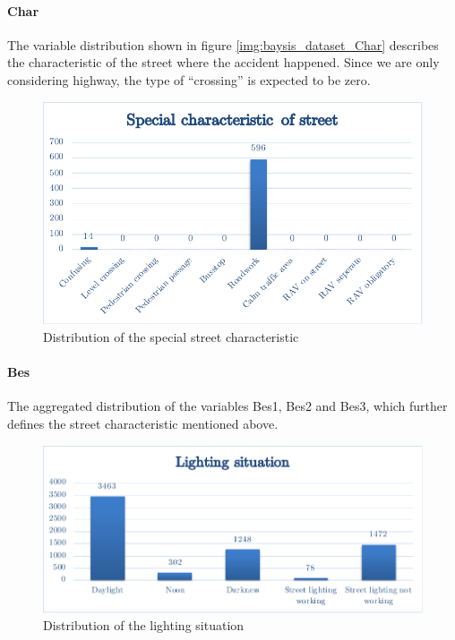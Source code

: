 \documentclass[a4paper,12pt]{report}
\begin{document}
\paragraph{Char}
The variable distribution shown in figure \ref{img:baysis_dataset_Char} describes the characteristic of the street where the accident happened. Since we are only considering highway, the type of “crossing” is expected to be zero. 

\begin{figure}[h]
	\centering
	\includegraphics[scale=0.6]{./assets/baysis_dataset_Bes.pdf}
	\caption{Distribution of the special street characteristic}
	\label{img:baysis_dataset_Bes}
\end{figure}

\paragraph{Bes}
The aggregated distribution of the variables Bes1, Bes2 and Bes3, which further defines the street characteristic mentioned above.

\begin{figure}[h]
	\centering
	\includegraphics[scale=0.6]{./assets/baysis_dataset_Lich.pdf}
	\caption{Distribution of the lighting situation}
	\label{img:baysis_dataset_Lich}
\end{figure}
\end{document}
